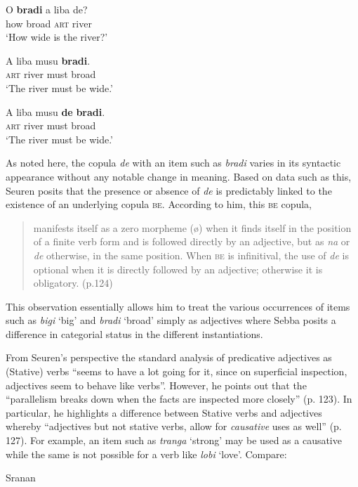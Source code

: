 \ex
\gll  O \textbf{bradi} a liba de?    \\
     how broad \textsc{art} river {\COP}\\
\glt `How wide is the river?'

\ex
\gll A liba musu \textbf{bradi}.\\
\textsc{art} river must broad\\
\glt `The river must be wide.'

\ex
\gll  A liba musu \textbf{de} \textbf{bradi}.\\
\textsc{art} river must {\COP} broad\\
\glt `The river must be wide.'\z \z

As noted here, the copula \textit{de} with an item such as
\textit{bradi} varies in its syntactic appearance without any notable
change in meaning.  Based on data such as this, Seuren posits that the
presence or absence of \textit{de} is predictably linked to the
existence of an underlying copula \textsc{be}.  According to him, this \textsc{be}
copula,

\begin{quote}
manifests itself as a zero morpheme (ø) when it finds itself in the
position of a finite verb form and is followed directly by an
adjective, but as \textit{na} or \textit{de} otherwise, in the same
position. When \textsc{be} is infinitival, the use of \textit{de} is optional
when it is directly followed by an adjective; otherwise it is
obligatory.  (p.124)
\end{quote}

This observation essentially allows him to treat the various
occurrences of items such as \textit{bigi} `big' and \textit{bradi}
`broad' simply as adjectives where Sebba posits a difference in
categorial status in the different instantiations.

From Seuren’s perspective the standard analysis of predicative
adjectives as (Stative) verbs “seems to have a lot going for it, since
on superficial inspection, adjectives seem to behave like verbs”.
However, he points out that the “parallelism breaks down when the
facts are inspected more closely'' (p. 123).  In particular, he
highlights a difference between Stative verbs and adjectives whereby
“adjectives but not stative verbs, allow for \textit{causative} uses
as well” (p. 127).  For example, an item such as \textit{tranga}
‘strong’ may be used as a causative while the same is not possible for
a verb like \textit{lobi} `love'.  Compare:

\ea%
\label{ex:3:11}
Sranan \citep[127]{Seuren1986}\\

